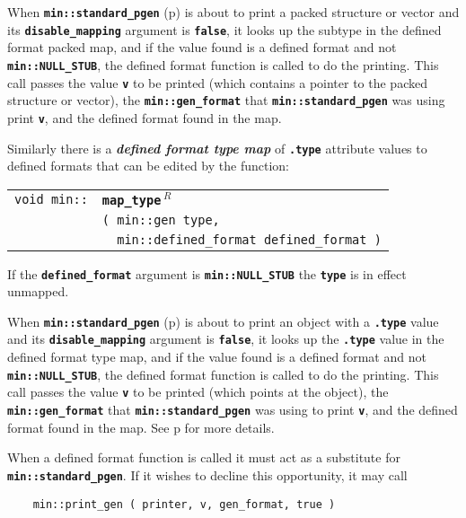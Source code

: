 \documentclass[12pt]{article}
\makeatletter
\newcommand{\TT}[1]{{\tt \bfseries #1}}
\newcommand{\key}[1]{{\bf \em #1}\index{#1}}
\newcommand{\ttindex}[1]{\index{#1@{\tt #1}}}
\newcommand{\pagref}[1]{p\pageref{#1}}
\newcommand{\EOL}{\penalty \exhyphenpenalty}
\newenvironment{indpar}[1][0.3in]%
	{\begin{list}{}%
		     {\setlength{\itemsep}{0in}%
		      \setlength{\topsep}{0in}%
		      \setlength{\parsep}{1ex}%
		      \setlength{\labelwidth}{#1}%
		      \setlength{\leftmargin}{#1}%
		      \addtolength{\leftmargin}{\labelsep}}%
	 \item}%
	{\end{list}}
\newcommand{\LABEL}[1]{\label{#1}}
\newlength{\ARGBREAKLENGTH}
\newcommand{\ARGBREAK}[1][\ARGBREAKLENGTH]{\\&\hspace*{#1}}
\newcommand{\MINKEY}[1]%
	   {\TT{#1}\ttindex{min::#1}\ttindex{#1}}
\newcommand{\REL}{$\,^R$}
\makeatother
\begin{document}
When \TT{min::standard\_pgen} (\pagref{MIN::STANDARD_PGEN}) is
about to print a packed structure or vector and its
\TT{disable\_\EOL mapping} argument is \TT{false}, it looks up the subtype in
the defined format packed map, and if the value found is a
defined format and not \TT{min::\EOL NULL\_\EOL STUB}, the defined
format function is called to do the printing.  This call passes
the value \TT{v} to be printed (which contains a pointer to the
packed structure or vector), the \TT{min::\EOL gen\_\EOL format}
that \TT{min::\EOL standard\_\EOL pgen} was using print \TT{v},
and the defined format found in the map.

Similarly there is a \key{defined format type map}%
\label{DEFINED-FORMAT-TYPE-MAP} of \TT{.type}
attribute values to defined formats that can be edited by the function:

\begin{indpar}\begin{tabular}{r@{}l}
\verb|void min::| & \MINKEY{map\_type\REL}\ARGBREAK
    \verb|( min::gen type,|\ARGBREAK
    \verb|  min::defined_format defined_format )|
\LABEL{MIN::MAP_TYPE_TO_DEFINED_FORMAT} \\
\end{tabular}\end{indpar}

If the \TT{defined\_format} argument is \TT{min::\EOL NULL\_\EOL STUB}
the \TT{type} is in effect unmapped.

When \TT{min::standard\_pgen} (\pagref{MIN::STANDARD_PGEN}) is
about to print an object with a \TT{.type} value and its
\TT{disable\_\EOL mapping} argument is \TT{false}, it looks up
the \TT{.type} value in
the defined format type map, and if the value found is a
defined format and not \TT{min::\EOL NULL\_\EOL STUB}, the defined
format function is called to do the printing.  This call passes
the value \TT{v} to be printed (which points at the object),
the \TT{min::\EOL gen\_\EOL format}
that \TT{min::\EOL standard\_\EOL pgen} was using to print \TT{v},
and the defined format found in the map.
See \pagref{DEFINED-FORMAT-TYPE-TRANSLATION} for more details.

When a defined format function is called it must act as a substitute
for \TT{min::\EOL standard\_\EOL pgen}.  If it wishes to decline this
opportunity, it may call
\begin{indpar}\begin{verbatim}
    min::print_gen ( printer, v, gen_format, true )
\end{verbatim}\end{indpar}
\end{document}
